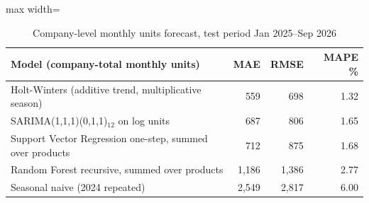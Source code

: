 \begin{table}[htbp]
\centering
\small
\caption{Company-level monthly units forecast, test period Jan 2025--Sep 2026}
\label{tab:company}
\begin{adjustbox}{max width=\linewidth}
\begin{tabular}{lrrr}
\toprule
\textbf{Model (company-total monthly units)} & \textbf{MAE} & \textbf{RMSE} & \textbf{MAPE \%} \\
\midrule
Holt-Winters (additive trend, multiplicative season) & 559 & 698 & 1.32 \\
SARIMA(1,1,1)(0,1,1)$_{12}$ on log units & 687 & 806 & 1.65 \\
Support Vector Regression one-step, summed over products & 712 & 875 & 1.68 \\
Random Forest recursive, summed over products & 1,186 & 1,386 & 2.77 \\
Seasonal naive (2024 repeated) & 2,549 & 2,817 & 6.00 \\
\bottomrule
\end{tabular}
\end{adjustbox}
\end{table}